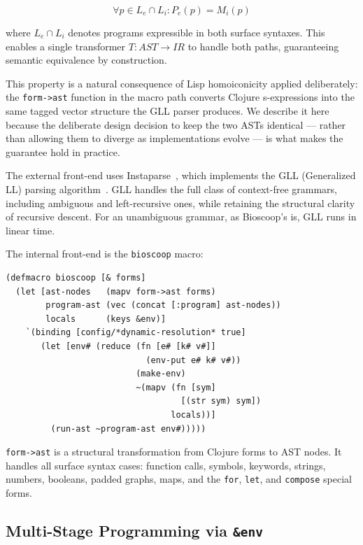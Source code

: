\documentclass[conference]{IEEEtran}
\begin{document}
\begin{equation}
\forall p \in L_e \cap L_i : P_e(p) = M_i(p)
\end{equation}

where $L_e \cap L_i$ denotes programs expressible in both surface syntaxes. This enables a single transformer $T : AST \rightarrow IR$ to handle both paths, guaranteeing semantic equivalence by construction.

This property is a natural consequence of Lisp homoiconicity applied deliberately: the \texttt{form->ast} function in the macro path converts Clojure s-expressions into the same tagged vector structure the GLL parser produces. We describe it here because the deliberate design decision to keep the two ASTs identical --- rather than allowing them to diverge as implementations evolve --- is what makes the guarantee hold in practice.

The external front-end uses Instaparse~\cite{instaparse}, which implements the GLL (Generalized LL) parsing algorithm~\cite{gll}. GLL handles the full class of context-free grammars, including ambiguous and left-recursive ones, while retaining the structural clarity of recursive descent. For an unambiguous grammar, as Bioscoop's is, GLL runs in linear time.

The internal front-end is the \texttt{bioscoop} macro:

\begin{lstlisting}[caption={The bioscoop macro}]
(defmacro bioscoop [& forms]
  (let [ast-nodes   (mapv form->ast forms)
        program-ast (vec (concat [:program] ast-nodes))
        locals      (keys &env)]
    `(binding [config/*dynamic-resolution* true]
       (let [env# (reduce (fn [e# [k# v#]]
                            (env-put e# k# v#))
                          (make-env)
                          ~(mapv (fn [sym]
                                   [(str sym) sym])
                                 locals))]
         (run-ast ~program-ast env#)))))
\end{lstlisting}

\texttt{form->ast} is a structural transformation from Clojure forms to AST nodes. It handles all surface syntax cases: function calls, symbols, keywords, strings, numbers, booleans, padded graphs, maps, and the \texttt{for}, \texttt{let}, and \texttt{compose} special forms.

\subsection{Multi-Stage Programming via \texttt{\&env}}
\end{document}
